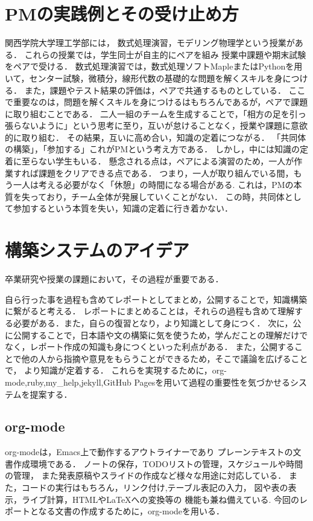 \documentclass{hissymp}
\begin{document}
\section{PMの実践例とその受け止め方}
\label{sec:org31f1417}
関西学院大学理工学部には，
数式処理演習，モデリング物理学という授業がある．
これらの授業では，学生同士が自主的にペアを組み
授業中課題や期末試験をペアで受ける．
数式処理演習では，数式処理ソフトMapleまたはPythonを用いて，センター試験，微積分，線形代数の基礎的な問題を解くスキルを身につける．
また，課題やテスト結果の評価は，ペアで共通するものとしている．
ここで重要なのは，問題を解くスキルを身につけるはもちろんであるが，ペアで課題に取り組むことである．
二人一組のチームを生成することで，「相方の足を引っ張らないように」という思考に至り，互いが怠けることなく，授業や課題に意欲的に取り組む．
その結果，互いに高め合い，知識の定着につながる．
「共同体の構築」，「参加する」これがPMという考え方である．
しかし，中には知識の定着に至らない学生もいる．
懸念される点は，ペアによる演習のため，一人が作業すれば課題をクリアできる点である．
つまり，一人が取り組んでいる間，もう一人は考える必要がなく「休憩」の時間になる場合がある.
これは，PMの本質を失っており，チーム全体が発展していくことがない．
この時，共同体として参加するという本質を失い，知識の定着に行き着かない．

\section{構築システムのアイデア}
\label{sec:orge2a4846}

卒業研究や授業の課題において，その過程が重要である．

自ら行った事を過程も含めてレポートとしてまとめ，公開することで，知識構築に繋がると考える．
レポートにまとめることは，それらの過程も含めて理解する必要がある．また，自らの復習となり，より知識として身につく．
次に，公に公開することで，日本語や文の構築に気を使うため，学んだことの理解だけでなく，レポート作成の知識も身につくといった利点がある．
また，公開することで他の人から指摘や意見をもらうことができるため，そこで議論を広げることで，
より知識が定着する．
これらを実現するために，org-mode,ruby,my\_help,jekyll,GitHub Pagesを用いて過程の重要性を気づかせるシステムを提案する．
\subsection{org-mode}
\label{sec:org22d0e31}
org-modeは，Emacs上で動作するアウトライナーであり
プレーンテキストの文書作成環境である．
ノートの保存，TODOリストの管理，スケジュールや時間の管理，
また発表原稿やスライドの作成など様々な用途に対応している．
また，コードの実行はもちろん，リンク付け,テーブル表記の入力，
図や表の表示，ライブ計算，HTMLや\LaTeX{}への変換等の
機能も兼ね備えている.
今回のレポートとなる文書の作成するために，org-modeを用いる．
\end{document}
